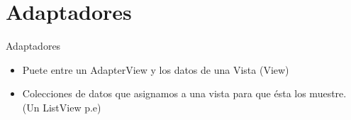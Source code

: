 \section{Adaptadores}
\begin{frame}{Adaptadores}
    \begin{itemize}
        \item {
            Puete entre un AdapterView y los datos de una Vista (View)\pause
        }
        \item {
           Colecciones de datos que asignamos a una vista para que ésta los muestre. (Un ListView p.e)
        }
    \end{itemize}
\end{frame}
